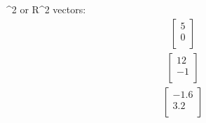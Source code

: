 ^{2} \; or \; R^{2} \; vectors:
\begin{align}
    \begin{bmatrix}
        5 \\
        0 \\
    \end{bmatrix}
\end{align}
\begin{align}
    \begin{bmatrix}
        12 \\
        -1 \\
    \end{bmatrix}
\end{align}
\begin{align}
    \begin{bmatrix}
        -1.6 \\
        3.2 \\
    \end{bmatrix}
\end{align}
